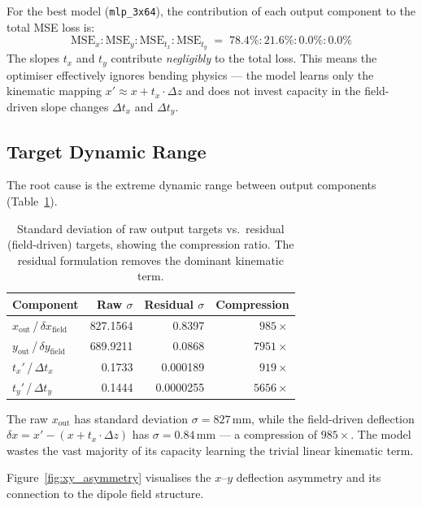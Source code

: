 \documentclass[11pt,a4paper]{article}
\newcommand{\dz}{\Delta z}
\newcommand{\tx}{t_x}
\newcommand{\ty}{t_y}
\begin{document}
For the best model (\texttt{mlp\_3x64}), the contribution of each output component to the total MSE loss is:
\begin{equation}
  \text{MSE}_x : \text{MSE}_y : \text{MSE}_{\tx} : \text{MSE}_{\ty} \;=\; 78.4\% : 21.6\% : 0.0\% : 0.0\%
\end{equation}
The slopes $\tx$ and $\ty$ contribute \emph{negligibly} to the total loss.
This means the optimiser effectively ignores bending physics --- the model learns only the kinematic mapping $x' \approx x + \tx \cdot \dz$ and does not invest capacity in the field-driven slope changes $\Delta\tx$ and $\Delta\ty$.

\subsection{Target Dynamic Range}
\label{sec:dynamic_range}

The root cause is the extreme dynamic range between output components (Table~\ref{tab:dynamic_range}).

\begin{table}[H]
\centering
\caption{Standard deviation of raw output targets vs.\ residual (field-driven) targets, showing the compression ratio. The residual formulation removes the dominant kinematic term.}
\label{tab:dynamic_range}
\begin{tabular}{@{}l r r r@{}}
\toprule
Component & Raw $\sigma$ & Residual $\sigma$ & Compression \\
\midrule
$x_\text{out}$\,/\,$\delta x_\text{field}$ & 827.1564 & 0.8397 & $985\times$ \\
$y_\text{out}$\,/\,$\delta y_\text{field}$ & 689.9211 & 0.0868 & $7951\times$ \\
$\tx'$\,/\,$\Delta\tx$                      & 0.1733   & 0.000189 & $919\times$ \\
$\ty'$\,/\,$\Delta\ty$                      & 0.1444   & 0.0000255 & $5656\times$ \\
\bottomrule
\end{tabular}
\end{table}

The raw $x_\text{out}$ has standard deviation $\sigma = 827$\,mm, while the field-driven deflection $\delta x = x' - (x + \tx \cdot \dz)$ has $\sigma = 0.84$\,mm --- a compression of $985\times$.
The model wastes the vast majority of its capacity learning the trivial linear kinematic term.

Figure~\ref{fig:xy_asymmetry} visualises the $x$--$y$ deflection asymmetry and its connection to the dipole field structure.
\end{document}
